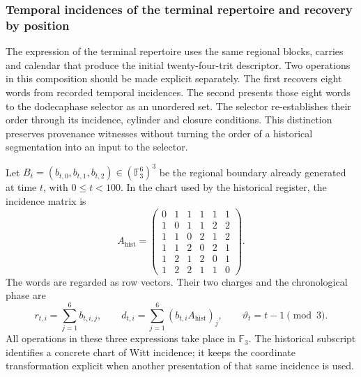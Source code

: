 \subsubsection{Temporal incidences of the terminal repertoire and recovery by position}
\label{sec:repertorio-incidencias-completas}

The expression of the terminal repertoire uses the same regional blocks, carries and calendar that produce the initial twenty-four-trit descriptor. Two operations in this composition should be made explicit separately. The first recovers eight words from recorded temporal incidences. The second presents those eight words to the dodecaphase selector as an unordered set. The selector re-establishes their order through its incidence, cylinder and closure conditions. This distinction preserves provenance witnesses without turning the order of a historical segmentation into an input to the selector.

Let $B_t=(b_{t,0},b_{t,1},b_{t,2})\in(\mathbb F_3^6)^3$ be the regional boundary already generated at time $t$, with $0\leq t<100$. In the chart used by the historical register, the incidence matrix is
\[
 A_{\mathrm{hist}}=
 \begin{pmatrix}
 0&1&1&1&1&1\\
 1&0&1&1&2&2\\
 1&1&0&2&1&2\\
 1&1&2&0&2&1\\
 1&2&1&2&0&1\\
 1&2&2&1&1&0
 \end{pmatrix}.
\]
The words are regarded as row vectors. Their two charges and the
chronological phase are
\[
 r_{t,i}=\sum_{j=1}^{6}b_{t,i,j},\qquad
 d_{t,i}=\sum_{j=1}^{6}(b_{t,i}A_{\mathrm{hist}})_j,
 \qquad \vartheta_t=t-1\pmod 3.
\]
All operations in these three expressions take place in $\mathbb F_3$. The historical subscript identifies a concrete chart of Witt incidence; it keeps the coordinate transformation explicit when another presentation of that same incidence is used.

